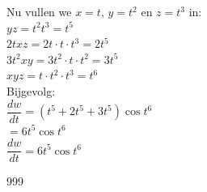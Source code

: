 \documentclass[a4paper]{article}
\begin{document}
Nu vullen we $x=t$, $y=t^2$ en $z=t^3$ in:\\

$yz=t^2t^3=t^5$\\

$2txz=2t\cdot t\cdot t^3=2t^5$\\

$3t^2xy=3t^2\cdot t\cdot t^2=3t^5$\\

$xyz=t\cdot t^2\cdot t^3=t^6$\\

Bijgevolg:\\

$\dfrac{dw}{dt}
=
\left(t^5+2t^5+3t^5\right)\cos t^6$\\

$=
6t^5\cos t^6$\\

$\boxed{\dfrac{dw}{dt}=6t^5\cos t^6}$\\

\begin{thebibliography}{999}
\end{thebibliography}
\end{document}
